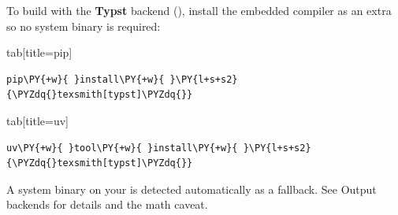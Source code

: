 \documentclass[a4paper,twoside]{article}
\begin{document}
To build with the \textbf{Typst} backend (), install the embedded compiler as an extra so no system binary is required:
\begin{tsdiv}{tab}[title=pip]
\begin{tscode}[lang=bash, engine=pygments]
\begin{Verbatim}[commandchars=\\\{\},breaklines, breakanywhere, commandchars=\\\{\}]
pip\PY{+w}{ }install\PY{+w}{ }\PY{l+s+s2}{\PYZdq{}texsmith[typst]\PYZdq{}}
\end{Verbatim}
\end{tscode}
\end{tsdiv}
\begin{tsdiv}{tab}[title=uv]
\begin{tscode}[lang=bash, engine=pygments]
\begin{Verbatim}[commandchars=\\\{\},breaklines, breakanywhere, commandchars=\\\{\}]
uv\PY{+w}{ }tool\PY{+w}{ }install\PY{+w}{ }\PY{l+s+s2}{\PYZdq{}texsmith[typst]\PYZdq{}}
\end{Verbatim}
\end{tscode}
\end{tsdiv}
A system  binary on your  is detected automatically as a fallback. See Output backends for details and the math caveat.
\end{document}
